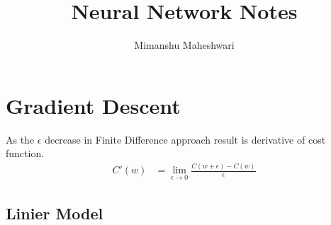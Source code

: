 \documentclass{article}
\begin{document}
\title{Neural Network Notes}
\author{Mimanshu Maheshwari}

\section{Gradient Descent}
As the $\epsilon$ decrease in Finite Difference approach result is derivative of cost function.
\begin{align}
	C'(w) &= \lim_{\epsilon \to 0}\frac{C(w + \epsilon) - C(w)}{\epsilon}
\end{align}

\subsection{Linier Model}
\end{document}

